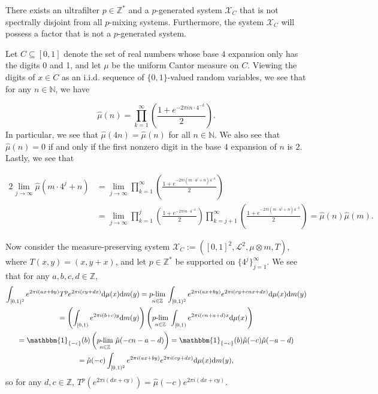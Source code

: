 \documentclass[graybox]{svmult}
\theoremstyle{definition}
\newcommand{\Z}{\mathbb{Z}}
\newcommand{\plimgG}[3]{\mathop {#1\text{-lim}}_{#2\in #3}\,}
\begin{document}
\begin{example}\label{ex:SecondExample}
    There exists an ultrafilter $p\in\Z^*$ and a $p$-generated system $\mathcal{X}_C$ that is not spectrally disjoint from all $p$-mixing systems.
    Furthermore, the system $\mathcal{X}_C$ will possess a factor that is not a $p$-generated system.

    Let $C \subseteq [0,1]$ denote the set of real numbers whose base $4$ expansion only has the digits 0 and 1, and let $\mu$ be the uniform Cantor measure on $C$.
    Viewing the digits of $x \in C$ as an i.i.d. sequence of $\{0,1\}$-valued random variables, we see that for any $n \in \mathbb{N}$, we have

    \begin{equation}
        \widehat{\mu}(n) = \prod_{k = 1}^\infty\left(\frac{1+e^{-2\pi i n\cdot4^{-k}}}{2}\right).
    \end{equation}
    In particular, we see that $\widehat{\mu}(4n) = \widehat{\mu}(n)$ for all $n \in \mathbb{N}$.
    We also see that $\widehat{\mu}(n) = 0$ if and only if the first nonzero digit in the base $4$ expansion of $n$ is $2$.
    Lastly, we see that

    \begin{alignat*}{2}
        \lim_{j\rightarrow\infty}\widehat{\mu}(m\cdot4^j+n) & = \lim_{j\rightarrow\infty}\prod_{k = 1}^\infty\left(\frac{1+e^{-2\pi i(m\cdot4^j+n)4^{-k}}}{2}\right)\\
        &= \lim_{j\rightarrow\infty}\prod_{k = 1}^j\left(\frac{1+e^{-2\pi in\cdot4^{-k}}}{2}\right)\prod_{k = j+1}^\infty\left(\frac{1+e^{-2\pi i(m\cdot4^j+n)4^{-k}}}{2}\right) = \widehat{\mu}(n)\widehat{\mu}(m).
    \end{alignat*}
    
    Now consider the measure-preserving system $\mathcal{X}_C := ([0,1]^2,\mathscr{L}^2,\mu\otimes m,T)$, where $T(x,y) = (x,y+x)$, and let $p \in \mathbb{Z}^*$ be supported on $\{4^j\}_{j = 1}^\infty$.
    We see that for any $a,b,c,d\in\Z$,
\begin{multline*}
        \int_{[0,1)^2}e^{2\pi i(ax+by)}T^pe^{2\pi i(cy+dx)}\text{d}\mu(x)\text{d}m(y) = \plimgG{p}{n}{\Z}
        \int_{[0,1)^2}e^{2\pi i(ax+by)}e^{2\pi i(cy+cnx+dx)}
        \text{d}\mu(x)\text{d}m(y)\\
        =\left(\int_{[0,1)}e^{2\pi i(b+c)y}\text{d}m(y)\right)\left(\plimgG{p}{n}{\Z}
        \int_{[0,1)}e^{2\pi i (cn+a+d)x}\text{d}\mu(x)\right)\\=\mathbbm{1}_{\{-c\}}(b)
       \left(\plimgG{p}{n}{\Z}
       \hat\mu(-cn-a-d)\right) =\mathbbm{1}_{\{-c\}}(b)
       \hat\mu(-c)\hat\mu(-a-d)\\
       = \hat\mu(-c)\int_{[0,1)^2}e^{2\pi i(ax+by)}e^{2\pi i(cy+dx)}\text{d}\mu(x)\text{d}m(y),
\end{multline*}
so for any $d,c\in \Z$, $T^p(e^{2\pi i(dx+cy)})=\hat\mu(-c)e^{2\pi i(dx+cy)}$. 


\end{example}
\end{document}

